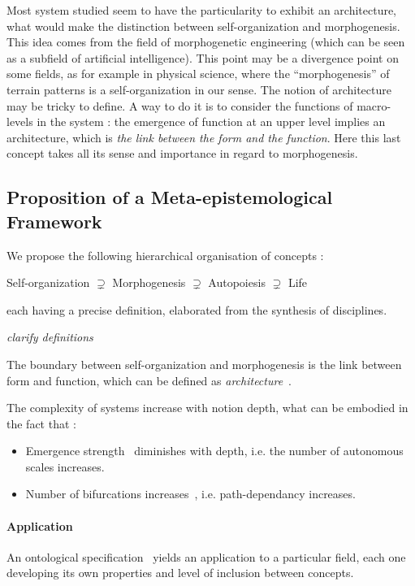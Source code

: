 \documentclass[fleqn,10pt]{wlscirep}
\begin{document}
Most system studied seem to have the particularity to exhibit an architecture, what would make the distinction between self-organization and morphogenesis. This idea comes from the field of morphogenetic engineering (which can be seen as a subfield of artificial intelligence). This point may be a divergence point on some fields, as for example in physical science, where the ``morphogenesis'' of terrain patterns is a self-organization in our sense. The notion of architecture may be tricky to define. A way to do it is to consider the functions of macro-levels in the system : the emergence of function at an upper level implies an architecture, which is \emph{the link between the form and the function}. Here this last concept takes all its sense and importance in regard to morphogenesis.


\subsection*{Proposition of a Meta-epistemological Framework}


We propose the following hierarchical organisation of concepts :

Self-organization $\supsetneq$ Morphogenesis $\supsetneq$ Autopoiesis $\supsetneq$ Life

each having a precise definition, elaborated from the synthesis of disciplines.

\textit{clarify definitions}

The boundary between self-organization and morphogenesis is the link between form and function, which can be defined as \emph{architecture}~\cite{doursat2013review}.

The complexity of systems increase with notion depth, what can be embodied in the fact that :
\begin{itemize}
\item Emergence strength~\cite{bedau2002downward} diminishes with depth, i.e. the number of autonomous scales increases.
\item Number of bifurcations increases~\cite{thom1974stabilite}, i.e. path-dependancy increases.
\end{itemize}


\paragraph{Application}

An ontological specification~\cite{livet2010ontology} yields an application to a particular field, each one developing its own properties and level of inclusion between concepts. 
\end{document}
